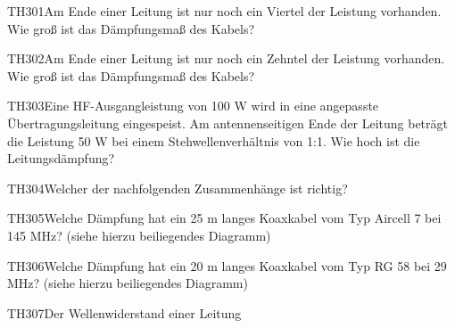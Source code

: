 \begin{question}{TH301}{Am Ende einer Leitung ist nur noch ein Viertel der Leistung vorhanden. Wie groß ist das Dämpfungsmaß des Kabels?}
\end{question}

\begin{question}{TH302}{Am Ende einer Leitung ist nur noch ein Zehntel der Leistung vorhanden. Wie groß ist das Dämpfungsmaß des Kabels?}
\end{question}

\begin{question}{TH303}{Eine HF-Ausgangleistung von 100 W wird in eine angepasste Übertragungsleitung eingespeist. Am antennenseitigen Ende der Leitung beträgt die Leistung 50 W bei einem Stehwellenverhältnis von 1:1. Wie hoch ist die Leitungsdämpfung?}
\end{question}

\begin{question}{TH304}{Welcher der nachfolgenden Zusammenhänge ist richtig?}
\end{question}

\begin{question}{TH305}{Welche Dämpfung hat ein 25 m langes Koaxkabel vom Typ Aircell 7 bei 145 MHz? (siehe hierzu beiliegendes Diagramm)}
\end{question}

\begin{question}{TH306}{Welche Dämpfung hat ein 20 m langes Koaxkabel vom Typ RG 58 bei 29 MHz? (siehe hierzu beiliegendes Diagramm)}
\end{question}

\begin{question}{TH307}{Der Wellenwiderstand einer Leitung}
\end{question}

